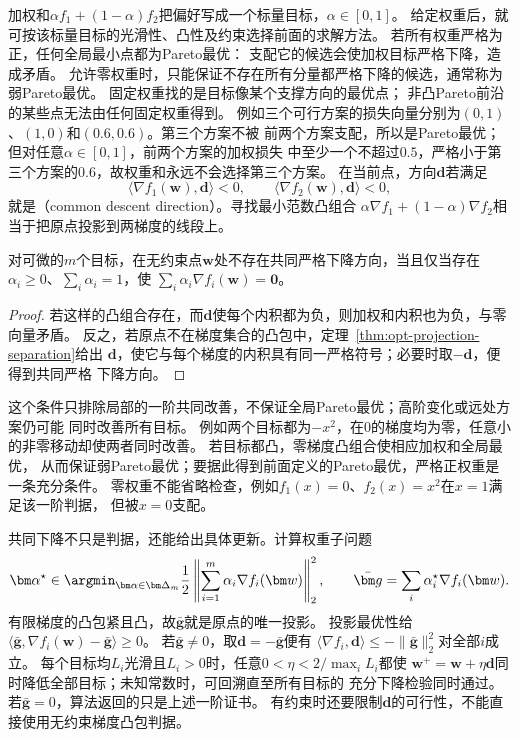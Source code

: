 加权和$\alpha f_1+(1-\alpha)f_2$把偏好写成一个标量目标，$\alpha\in[0,1]$。
给定权重后，就可按该标量目标的光滑性、凸性及约束选择前面的求解方法。
若所有权重严格为正，任何全局最小点都为Pareto最优：
支配它的候选会使加权目标严格下降，造成矛盾。
允许零权重时，只能保证不存在所有分量都严格下降的候选，通常称为弱Pareto最优。
固定权重找的是目标像某个支撑方向的最优点；
非凸Pareto前沿的某些点无法由任何固定权重得到。
例如三个可行方案的损失向量分别为$(0,1)$、$(1,0)$和$(0.6,0.6)$。第三个方案不被
前两个方案支配，所以是Pareto最优；但对任意$\alpha\in[0,1]$，前两个方案的加权损失
中至少一个不超过$0.5$，严格小于第三个方案的$0.6$，故权重和永远不会选择第三个方案。
在当前点，方向$\bm{d}$若满足
\[
  \langle\nabla f_1(\bm{w}),\bm{d}\rangle<0,\qquad
  \langle\nabla f_2(\bm{w}),\bm{d}\rangle<0,
\]
就是（common descent direction）。寻找最小范数凸组合
$\alpha\nabla f_1+(1-\alpha)\nabla f_2$相当于把原点投影到两梯度的线段上。

\begin{theorem}[无共同下降方向的一阶判定]
\label{thm:opt-common-descent}
对可微的$m$个目标，在无约束点$\bm{w}$处不存在共同严格下降方向，当且仅当存在
$\alpha_i\geq0$、$\sum_i\alpha_i=1$，使
$\sum_i\alpha_i\nabla f_i(\bm{w})=\bm{0}$。
\end{theorem}

\begin{proof}
若这样的凸组合存在，而$\bm{d}$使每个内积都为负，则加权和内积也为负，与零向量矛盾。
反之，若原点不在梯度集合的凸包中，定理~\ref{thm:opt-projection-separation}给出
$\bm{d}$，使它与每个梯度的内积具有同一严格符号；必要时取$-\bm{d}$，便得到共同严格
下降方向。
\end{proof}

这个条件只排除局部的一阶共同改善，不保证全局Pareto最优；高阶变化或远处方案仍可能
同时改善所有目标。
例如两个目标都为$-x^2$，在$0$的梯度均为零，任意小的非零移动却使两者同时改善。
若目标都凸，零梯度凸组合使相应加权和全局最优，
从而保证弱Pareto最优；要据此得到前面定义的Pareto最优，严格正权重是一条充分条件。
零权重不能省略检查，例如$f_1(x)=0$、$f_2(x)=x^2$在$x=1$满足该一阶判据，
但被$x=0$支配。

共同下降不只是判据，还能给出具体更新。计算权重子问题
\[
 \bm\alpha^\star\in\argmin_{\bm\alpha\in\bm\Delta_m}
 \frac12\left\|\sum_{i=1}^m\alpha_i\nabla f_i(\bm w)\right\|_2^2,
 \qquad
 \bar{\bm g}=\sum_i\alpha_i^\star\nabla f_i(\bm w).
\]
有限梯度的凸包紧且凸，故$\bar{\bm g}$就是原点的唯一投影。
投影最优性给
$\langle\bar{\bm g},\nabla f_i(\bm w)-\bar{\bm g}\rangle\geq0$。
若$\bar{\bm g}\neq0$，取$\bm d=-\bar{\bm g}$便有
$\langle\nabla f_i,\bm d\rangle\leq-\|\bar{\bm g}\|_2^2$对全部$i$成立。
每个目标均$L_i$光滑且$L_i>0$时，任意$0<\eta<2/\max_i L_i$都使
$\bm w^+=\bm w+\eta\bm d$同时降低全部目标；未知常数时，可回溯直至所有目标的
充分下降检验同时通过。若$\bar{\bm g}=0$，算法返回的只是上述一阶证书。
有约束时还要限制$\bm d$的可行性，不能直接使用无约束梯度凸包判据。

